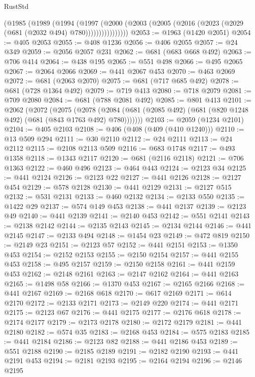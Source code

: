 \begin{lexlean}{RustStd}
\begin{coremodule}
              (@1985
                (@1989
                  (@1994
                    (@1997
                      (@2000
                        (@2003 (@2005 (@2016 (@2023 (@2029 (@681 (@2032 @494) @780))))))))))))))))
@2053 := @1963 (@1420 @2051)
@2054 := @405 @2053
@2055 := @408 @1236
@2056 := @406 @2055
@2057 := @24 @349
@2059 := @2056 @2057 @231
@2062 := @681 (@683 @668 @492)
@2063 := @706 @414
@2064 := @438 @195
@2065 := @551 @498
@2066 := @495 @2065
@2067 := @2064 @2066
@2069 := @441 @2067 @453
@2070 := @463 @2069
@2072 := @681 (@2063 @2070)
@2075 := @681 (@717 @685 @492)
@2078 := @681 (@728 @1364 @492)
@2079 := @719 @413
@2080 := @718 @2079
@2081 := @709 @2080
@2084 := @681 (@788 @2081 @492)
@2085 := @801 @413
@2101 := @2062
    (@2072
      (@2075
        (@2078 (@2084 (@681 (@2085 @492) (@681 (@820 @1248 @492) (@681 (@843 @1763 @492) @780)))))))
@2103 := @2059 (@1234 @2101)
@2104 := @405 @2103
@2108 := @406 (@408 (@409 (@410 @1240)))
@2110 := @13 @509 @294
@2111 := @30 @2110
@2112 := @24 @2111
@2113 := @24 @2112
@2115 := @2108 @2113 @509
@2116 := @683 @1748
@2117 := @493 @1358
@2118 := @1343 @2117
@2120 := @681 (@2116 @2118)
@2121 := @706 @1363
@2122 := @460 @496
@2123 := @464 @443
@2124 := @2123 @34
@2125 := @441 @2124
@2126 := @2123 @22
@2127 := @441 @2126
@2128 := @2127 @454
@2129 := @578 @2128
@2130 := @441 @2129
@2131 := @2127 @515
@2132 := @531 @2131
@2133 := @460 @2132
@2134 := @2133 @550
@2135 := @1422 @29
@2137 := @574 @149 @453
@2138 := @441 @2137
@2139 := @2123 @49
@2140 := @441 @2139
@2141 := @2140 @453
@2142 := @551 @2141
@2143 := @2138 @2142
@2144 := @2135 @2143
@2145 := @2134 @2144
@2146 := @441 @2145
@2147 := @2133 @494
@2148 := @1454 @23
@2149 := @472 @819
@2150 := @2149 @23
@2151 := @2123 @57
@2152 := @441 @2151
@2153 := @1350 @453
@2154 := @2152 @2153
@2155 := @2150 @2154
@2157 := @441 @2155 @453
@2158 := @495 @2157
@2159 := @2150 @2158
@2161 := @441 @2159 @453
@2162 := @2148 @2161
@2163 := @2147 @2162
@2164 := @441 @2163
@2165 := @1498 @58
@2166 := @1370 @453
@2167 := @2165 @2166
@2168 := @441 @2167
@2169 := @2168 @618
@2170 := @617 @2169
@2171 := @614 @2170
@2172 := @2133 @2171
@2173 := @2149 @220
@2174 := @441 @2171
@2175 := @2123 @67
@2176 := @441 @2175
@2177 := @2176 @618
@2178 := @2174 @2177
@2179 := @2173 @2178
@2180 := @2172 @2179
@2181 := @441 @2180
@2182 := @574 @35
@2183 := @2168 @453
@2184 := @575 @2183
@2185 := @441 @2184
@2186 := @2123 @82
@2188 := @441 @2186 @453
@2189 := @551 @2188
@2190 := @2185 @2189
@2191 := @2182 @2190
@2193 := @441 @2191 @453
@2194 := @2181 @2193
@2195 := @2164 @2194
@2196 := @2146 @2195

\end{coremodule}
\end{lexlean}
